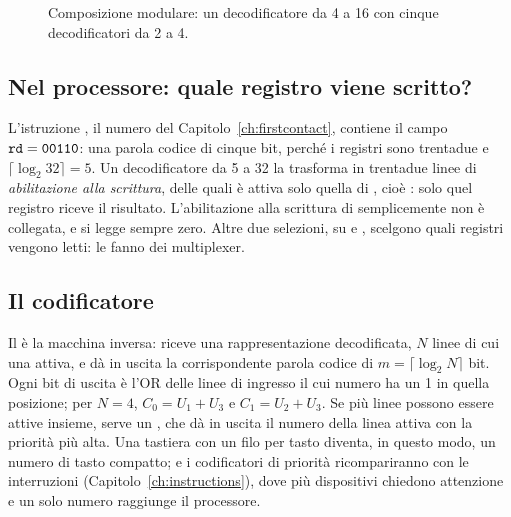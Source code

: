 \begin{figure}[htb]
\centering
{}
\caption{Composizione modulare: un decodificatore da 4 a 16 con cinque
decodificatori da 2 a 4.}
\label{fig:cm:dec16}
\end{figure}

\subsection{Nel processore: quale registro viene scritto?}

\begin{prgmachine}
L'istruzione , il numero  del
Capitolo~\ref{ch:firstcontact}, contiene il campo
$\texttt{rd}=\texttt{00110}$: una parola codice di cinque bit, perché i registri
sono trentadue e $\lceil\log_2 32\rceil=5$. Un decodificatore da 5 a 32 la
trasforma in trentadue linee di \emph{abilitazione alla scrittura}, delle quali
è attiva solo quella di , cioè : solo quel registro riceve il
risultato. L'abilitazione alla scrittura di  semplicemente non è
collegata, e  si legge sempre zero. Altre due selezioni, su 
e , scelgono quali registri vengono letti: le fanno dei multiplexer.
\end{prgmachine}

\subsection{Il codificatore}

Il  è la macchina inversa: riceve una rappresentazione
decodificata, $N$ linee di cui una attiva, e dà in uscita la corrispondente
parola codice di $m=\lceil\log_2 N\rceil$ bit. Ogni bit di uscita è l'OR delle
linee di ingresso il cui numero ha un 1 in quella posizione; per $N=4$,
$C_0=U_1+U_3$ e $C_1=U_2+U_3$. Se più linee possono essere attive insieme,
serve un , che dà in uscita il numero della
linea attiva con la priorità più alta. Una tastiera con un filo per tasto
diventa, in questo modo, un numero di tasto compatto; e i codificatori di
priorità ricompariranno con le interruzioni
(Capitolo~\ref{ch:instructions}), dove più dispositivi chiedono attenzione e un
solo numero raggiunge il processore.

